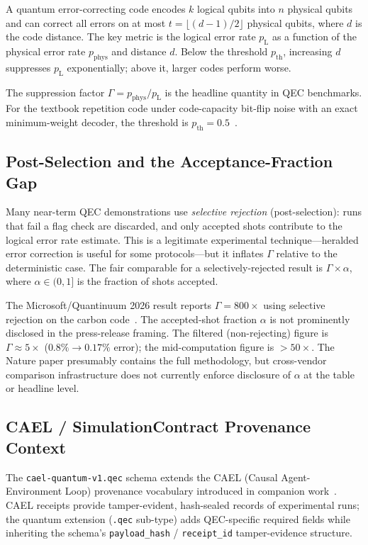 \documentclass[conference]{IEEEtran}
\newcommand{\pL}{p_{\mathrm{L}}}    %
\newcommand{\pP}{p_{\mathrm{phys}}} %
\newcommand{\pth}{p_{\mathrm{th}}}  %
\newcommand{\af}{\alpha}            %
\newcommand{\suppfactor}{\Gamma}    %
\begin{document}
A quantum error-correcting code encodes $k$ logical qubits into $n$
physical qubits and can correct all errors on at most $t = \lfloor
(d-1)/2 \rfloor$ physical qubits, where $d$ is the code distance. The
key metric is the logical error rate $\pL$ as a function of the physical
error rate $\pP$ and distance $d$. Below the threshold $\pth$, increasing
$d$ suppresses $\pL$ exponentially; above it, larger codes perform worse.

The suppression factor $\suppfactor = \pP / \pL$ is the headline quantity
in QEC benchmarks. For the textbook repetition code under code-capacity
bit-flip noise with an exact minimum-weight decoder, the threshold is
$\pth = 0.5$~\cite{fowler2012threshold, dennis2002topological}.

\subsection{Post-Selection and the Acceptance-Fraction Gap}

Many near-term QEC demonstrations use \emph{selective rejection}
(post-selection): runs that fail a flag check are discarded, and only
accepted shots contribute to the logical error rate estimate. This is a
legitimate experimental technique---heralded error correction is useful
for some protocols---but it inflates $\suppfactor$ relative to the
deterministic case. The fair comparable for a selectively-rejected result
is $\suppfactor \times \af$, where $\af \in (0, 1]$ is the fraction of
shots accepted.

The Microsoft/Quantinuum 2026 result reports $\suppfactor = 800\times$
using selective rejection on the carbon code~\cite{msft-quantinuum-nature2026}.
The accepted-shot fraction $\af$ is not prominently disclosed in the
press-release framing. The filtered (non-rejecting) figure is
$\suppfactor \approx 5\times$ ($0.8\% \to 0.17\%$ error); the
mid-computation figure is $> 50\times$. The Nature paper presumably
contains the full methodology, but cross-vendor comparison infrastructure
does not currently enforce disclosure of $\af$ at the table or headline
level.

\subsection{CAEL / SimulationContract Provenance Context}

The \texttt{cael-quantum-v1.qec} schema extends the CAEL
(Causal Agent-Environment Loop) provenance vocabulary introduced in
companion work~\cite{cael-aamas2026}. CAEL receipts provide
tamper-evident, hash-sealed records of experimental runs; the quantum
extension (\texttt{.qec} sub-type) adds QEC-specific required fields
while inheriting the schema's \texttt{payload\_hash} / \texttt{receipt\_id}
tamper-evidence structure.
\end{document}
